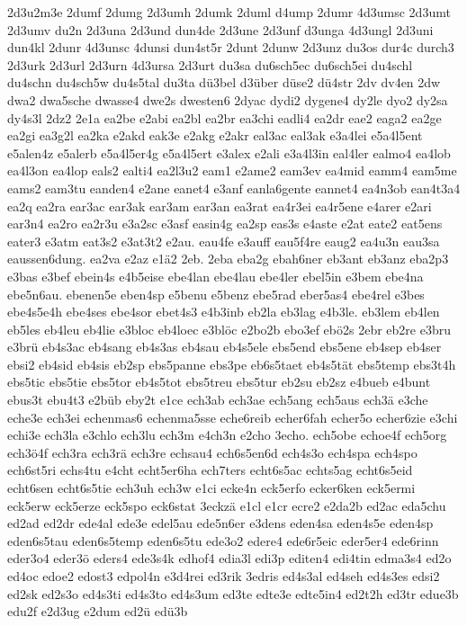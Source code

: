 {2d3u2m3e
2dumf
2dumg
2d3umh
2dumk
2duml
d4ump
2dumr
4d3umsc
2d3umt
2d3umv
du2n
2d3una
2d3und
dun4de
2d3une
2d3unf
d3unga
4d3ungl
2d3uni
dun4kl
2dunr
4d3unsc
4dunsi
dun4st5r
2dunt
2dunw
2d3unz
du3os
dur4c
durch3
2d3urk
2d3url
2d3urn
4d3ursa
2d3urt
du3sa
du6sch5ec
du6sch5ei
du4schl
du4schn
du4sch5w
du4s5tal
du3ta
dü3bel
d3über
düse2
dü4str
2dv
dv4en
2dw
dwa2
dwa5sche
dwasse4
dwe2s
dwesten6
2dyac
dydi2
dygene4
dy2le
dyo2
dy2sa
dy4s3l
2dz2
2e1a
ea2be
e2abi
ea2bl
ea2br
ea3chi
eadli4
ea2dr
eae2
eaga2
ea2ge
ea2gi
ea3g2l
ea2ka
e2akd
eak3e
e2akg
e2akr
eal3ac
eal3ak
e3a4lei
e5a4l5ent
e5alen4z
e5alerb
e5a4l5er4g
e5a4l5ert
e3alex
e2ali
e3a4l3in
eal4ler
ealmo4
ea4lob
ea4l3on
ea4lop
eals2
ealti4
ea2l3u2
eam1
e2ame2
eam3ev
ea4mid
eamm4
eam5me
eams2
eam3tu
eanden4
e2ane
eanet4
e3anf
eanla6gente
eannet4
ea4n3ob
ean4t3a4
ea2q
ea2ra
ear3ac
ear3ak
ear3am
ear3an
ea3rat
ea4r3ei
ea4r5ene
e4arer
e2ari
ear3n4
ea2ro
ea2r3u
e3a2sc
e3asf
easin4g
ea2sp
eas3s
e4aste
e2at
eate2
eat5ens
eater3
e3atm
eat3s2
e3at3t2
e2au.
eau4fe
e3auff
eau5f4re
eaug2
ea4u3n
eau3sa
eaussen6dung.
ea2va
e2az
e1ä2
2eb.
2eba
eba2g
ebah6ner
eb3ant
eb3anz
eba2p3
e3bas
e3bef
ebein4s
e4b5eise
ebe4lan
ebe4lau
ebe4ler
ebel5in
e3bem
ebe4na
ebe5n6au.
ebenen5e
eben4sp
e5benu
e5benz
ebe5rad
eber5as4
ebe4rel
e3bes
ebe4s5e4h
ebe4ses
ebe4sor
ebet4s3
e4b3inb
eb2la
eb3lag
e4b3le.
eb3lem
eb4len
eb5les
eb4leu
eb4lie
e3bloc
eb4loec
e3blöc
e2bo2b
ebo3ef
ebö2s
2ebr
eb2re
e3bru
e3brü
eb4s3ac
eb4sang
eb4s3as
eb4sau
eb4s5ele
ebs5end
ebs5ene
eb4sep
eb4ser
ebsi2
eb4sid
eb4sis
eb2sp
ebs5panne
ebs3pe
eb6s5taet
eb4s5tät
ebs5temp
ebs3t4h
ebs5tic
ebs5tie
ebs5tor
eb4s5tot
ebs5treu
ebs5tur
eb2su
eb2sz
e4bueb
e4bunt
ebus3t
ebu4t3
e2büb
eby2t
e1ce
ech3ab
ech3ae
ech5ang
ech5aus
ech3ä
e3che
eche3e
ech3ei
echenmas6
echenma5sse
eche6reib
echer6fah
echer5o
echer6zie
e3chi
echi3e
ech3la
e3chlo
ech3lu
ech3m
e4ch3n
e2cho
3echo.
ech5obe
echoe4f
ech5org
ech3ö4f
ech3ra
ech3rä
ech3re
echsau4
ech6s5en6d
ech4s3o
ech4spa
ech4spo
ech6st5ri
echs4tu
e4cht
echt5er6ha
ech7ters
echt6s5ac
echts5ag
echt6s5eid
echt6sen
echt6s5tie
ech3uh
ech3w
e1ci
ecke4n
eck5erfo
ecker6ken
eck5ermi
eck5erw
eck5erze
eck5spo
eck6stat
3eckzä
e1cl
e1cr
ecre2
e2da2b
ed2ac
eda5chu
ed2ad
ed2dr
ede4al
ede3e
edel5au
ede5n6er
e3dens
eden4sa
eden4s5e
eden4sp
eden6s5tau
eden6s5temp
eden6s5tu
ede3o2
edere4
ede6r5eic
eder5er4
ede6rinn
eder3o4
eder3ö
eders4
ede3s4k
edhof4
edia3l
edi3p
editen4
edi4tin
edma3s4
ed2o
ed4oc
edoe2
edost3
edpol4n
e3d4rei
ed3rik
3edris
ed4s3al
ed4seh
ed4s3es
edsi2
ed2sk
ed2s3o
ed4s3ti
ed4s3to
ed4s3um
ed3te
edte3e
edte5in4
ed2t2h
ed3tr
edue3b
edu2f
e2d3ug
e2dum
ed2ü
edü3b
}
